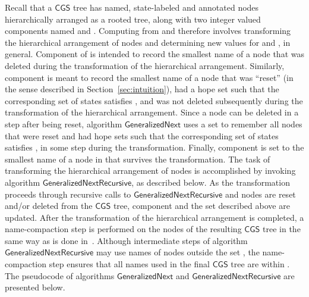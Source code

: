 \documentclass[3p]{elsarticle}
\newcommand{\CGS}{\ensuremath{\textsf{CGS }}}
\newcommand{\algo}[1]{\ensuremath{\textsf{{#1}}}}
\begin{document}
Recall that a \CGS tree has named, state-labeled and annotated nodes
hierarchically arranged as a rooted tree, along with two integer
valued components named  and .  Computing  from  and
 therefore involves transforming the hierarchical arrangement
of nodes and determining new values for  and , in general.
Component  of  is intended to record the smallest name of a
node that was deleted during the transformation of the hierarchical
arrangement.  Similarly, component  is meant to record the smallest
name of a node that was ``reset'' (in the sense described in
Section~\ref{sec:intuition}), had a hope set such that the
corresponding set of  states satisfies , and was not
deleted subsequently during the transformation of the hierarchical
arrangement.  Since a node can be deleted in a step after being reset,
algorithm \algo{GeneralizedNext} uses a set  to remember all nodes
that were reset and had hope sets such that the corresponding set of
 states satisfies , in some step during the
transformation.  Finally, component  is set to the smallest name of
a node in  that survives the transformation.  The task of
transforming the hierarchical arrangement of nodes is accomplished by
invoking algorithm \algo{GeneralizedNextRecursive}, as described
below.  As the transformation proceeds through recursive calls to
\algo{GeneralizedNextRecursive} and nodes are reset and/or deleted
from the \CGS tree, component  and the set  described above are
updated.  After the transformation of the hierarchical arrangement is
completed, a name-compaction step is performed on the nodes of the
resulting \CGS tree in the same way as is done in~\cite{piterman}.
Although intermediate steps of algorithm
\algo{GeneralizedNextRecursive} may use names of nodes outside the set
, the name-compaction step ensures that all names used in the
final \CGS tree  are within . The pseudocode of algorithms
\algo{GeneralizedNext} and \algo{GeneralizedNextRecursive} are
presented below.
\end{document}
